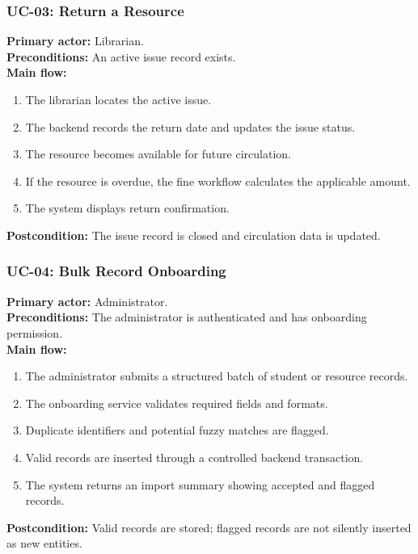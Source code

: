 \documentclass[12pt,a4paper]{report}
\begin{document}
\subsubsection{UC-03: Return a Resource}
\textbf{Primary actor:} Librarian.\\
\textbf{Preconditions:} An active issue record exists.\\
\textbf{Main flow:}
\begin{enumerate}
\item The librarian locates the active issue.
\item The backend records the return date and updates the issue status.
\item The resource becomes available for future circulation.
\item If the resource is overdue, the fine workflow calculates the applicable amount.
\item The system displays return confirmation.
\end{enumerate}
\textbf{Postcondition:} The issue record is closed and circulation data is updated.

\subsubsection{UC-04: Bulk Record Onboarding}
\textbf{Primary actor:} Administrator.\\
\textbf{Preconditions:} The administrator is authenticated and has onboarding permission.\\
\textbf{Main flow:}
\begin{enumerate}
\item The administrator submits a structured batch of student or resource records.
\item The onboarding service validates required fields and formats.
\item Duplicate identifiers and potential fuzzy matches are flagged.
\item Valid records are inserted through a controlled backend transaction.
\item The system returns an import summary showing accepted and flagged records.
\end{enumerate}
\textbf{Postcondition:} Valid records are stored; flagged records are not silently inserted as new entities.
\end{document}
